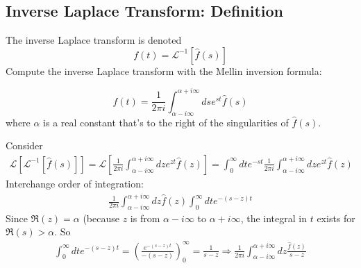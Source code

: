 \subsection{Inverse Laplace Transform: Definition}

\begin{definition}
The inverse Laplace transform is denoted
\begin{equation}
f(t) = \mathcal{L}^{-1}[ \widehat{f}(s) ]
\end{equation}
Compute the inverse Laplace transform with the Mellin inversion formula:

\begin{equation}
f(t) = \frac{1}{2\pi i} \int_{\alpha - i \infty}^{\alpha + i \infty} ds e^{st} \widehat{f}(s)
\end{equation}
where $\alpha$ is a real constant that's to the right of the singularities of $\widehat{f}(s)$.
\end{definition}

Consider 
\[
\begin{gathered}
\mathcal{L} [ \mathcal{L}^{-1} [\widehat{f}(s)] ] =  \mathcal{L} \left[ \frac{1}{2\pi i} \int_{\alpha - i \infty}^{\alpha + i \infty} dz e^{zt} \widehat{f}(z) \right] = \int_0^{\infty} dt e^{-st} \frac{1}{2\pi i} \int_{\alpha - i \infty}^{\alpha + i \infty} dz e^{zt} \widehat{f}(z)
\end{gathered}
\]
Interchange order of integration:
\[
\begin{gathered}
\frac{1}{2\pi i} \int_{\alpha - i \infty }^{\alpha + i \infty} dz \widehat{f}(z) \int_0^{\infty} dt e^{-(s- z) t}
\end{gathered}
\]
Since $\Re{ (z)} = \alpha$ (because $z$ is from $\alpha - i \infty$ to $\alpha + i \infty$, the integral in $t$ exists for $\Re{ (s)} > \alpha$.
So
\[
\begin{gathered}
\int_0^{\infty} dt e^{-(s-z)t} =  \left( \frac{ e^{-(s-z)t} }{ -(s-z) } \right)_0^{\infty} = \frac{1}{s-z} \Longrightarrow \frac{1}{2 \pi i} \int_{\alpha - i \infty}^{\alpha + i \infty} dz \frac{\widehat{f}(z) }{ s-z}
\end{gathered}
\]

